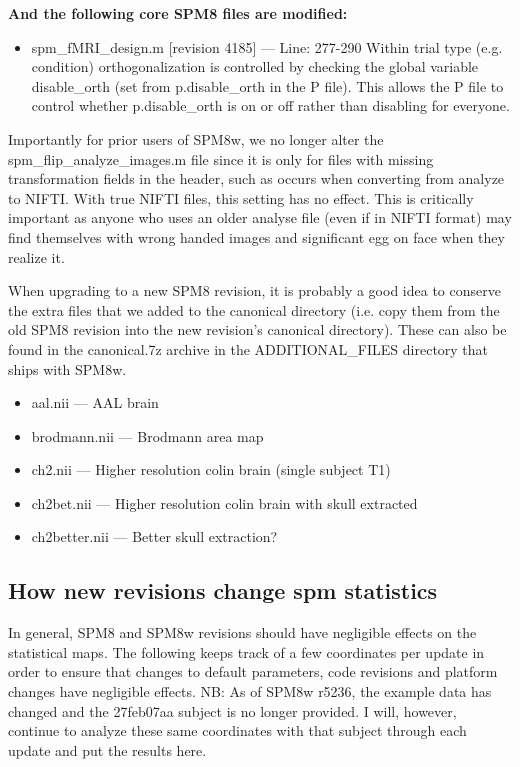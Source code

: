 \documentclass[12pt]{article}
\begin{document}
\noindent
\textbf{And the following core SPM8 files are modified:}
\begin{itemize}
	\item spm\_fMRI\_design.m  [revision 4185] --- Line: 277-290 Within trial type (e.g. condition) orthogonalization is controlled by checking the global variable disable\_orth (set from p.disable\_orth in the P file). This allows the P file to control whether p.disable\_orth is on or off rather than disabling for everyone. 
\end{itemize}

Importantly for prior users of SPM8w, we no longer alter the spm\_flip\_analyze\_images.m file since it is only for files with missing transformation fields in the header, such as occurs when converting from analyze to NIFTI. With true NIFTI files, this setting has no effect. This is critically important as anyone who uses an older analyse file (even if in NIFTI format) may find themselves with wrong handed images and significant egg on face when they realize it.

\vspace{\baselineskip}
When upgrading to a new SPM8 revision, it is probably a good idea to conserve the extra files that we added to the canonical directory (i.e. copy them from the old SPM8 revision into the new revision's canonical directory). These can also be found in the canonical.7z archive in the ADDITIONAL\_FILES directory that ships with SPM8w. 
\begin{itemize}
	\item aal.nii --- AAL brain
	\item brodmann.nii --- Brodmann area map
	\item ch2.nii --- Higher resolution colin brain (single subject T1)
	\item ch2bet.nii --- Higher resolution colin brain with skull extracted
	\item ch2better.nii --- Better skull extraction?
\end{itemize}

\subsection{How new revisions change spm statistics}
In general, SPM8 and SPM8w revisions should have negligible effects on the statistical maps. The following keeps track of a few coordinates per update in order to ensure that changes to default parameters, code revisions and platform changes have negligible effects. NB: As of SPM8w r5236, the example data has changed and the 27feb07aa subject is no longer provided. I will, however, continue to analyze these same coordinates with that subject through each update and put the results here. 
\end{document}
